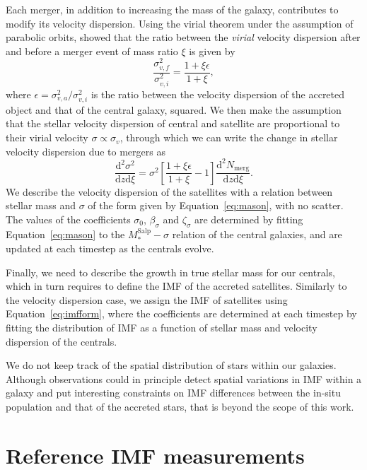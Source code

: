 \documentclass[usenatbib, letters]{mnras}
\def\msalp{M_*^{\mathrm{Salp}}}
\def\Eref#1{Equation~\ref{#1}\xspace}
\begin{document}
Each merger, in addition to increasing the mass of the galaxy, contributes to modify its velocity dispersion. Using the virial theorem under the assumption of parabolic orbits, \citet{NJO09} showed that the ratio between the {\em virial} velocity dispersion after and before a merger event of mass ratio $\xi$ is given by
\begin{equation}
\frac{\sigma_{v,f}^2}{\sigma_{v,i}^2} = \frac{1 + \xi\epsilon}{1 + \xi},
\end{equation}
where $\epsilon = \sigma_{v,a}^2/\sigma_{v,i}^2$ is the ratio between the velocity dispersion of the accreted object and that of the central galaxy, squared.
We then make the assumption that the stellar velocity dispersion of central and satellite are proportional to their virial velocity $\sigma \propto \sigma_v$, through which we can write the change in stellar velocity dispersion due to mergers as
\begin{equation}
\frac{\mathrm{d}^2\sigma^2}{\mathrm{d}z\mathrm{d}\xi} = \sigma^2\left[\frac{1 + \xi\epsilon}{1 + \xi} - 1\right]\frac{\mathrm{d}^2N_{\mathrm{merg}}}{\mathrm{d}z \mathrm{d}\xi}.
\end{equation}
We describe the velocity dispersion of the satellites with a relation between stellar mass and $\sigma$ of the form given by \Eref{eq:mason}, with no scatter. The values of the coefficients $\sigma_0$, $\beta_\sigma$ and $\zeta_\sigma$ are determined by fitting \Eref{eq:mason} to the $\msalp-\sigma$ relation of the central galaxies, and are updated at each timestep as the centrals evolve.

Finally, we need to describe the growth in true stellar mass for our centrals, which in turn requires to define the IMF of the accreted satellites.
Similarly to the velocity dispersion case, we assign the IMF of satellites using \Eref{eq:imfform}, where the coefficients are determined at each timestep by fitting the distribution of IMF as a function of stellar mass and velocity dispersion of the centrals.

We do not keep track of the spatial distribution of stars within our galaxies. Although observations could in principle detect spatial variations in IMF within a galaxy and put interesting constraints on IMF differences between the in-situ population and that of the accreted stars, that is beyond the scope of this work.


\section{Reference IMF measurements}\label{sect:obs}
\end{document}
